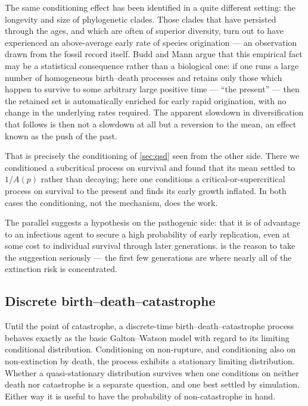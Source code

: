 The same conditioning effect has been identified in a quite different setting: the
longevity and size of phylogenetic clades. Those clades that have persisted through the
ages, and which are often of superior diversity, turn out to have experienced an
above-average early rate of species origination --- an observation drawn from the fossil
record itself. Budd and Mann \cite{Budd2018} argue that this empirical fact may be a
statistical consequence rather than a biological one: if one runs a large number of
homogeneous birth--death processes and retains only those which happen to survive to
some arbitrary large positive time --- ``the present'' --- then the retained set is
automatically enriched for early rapid origination, with no change in the underlying
rates required. The apparent slowdown in diversification that follows is then not a
slowdown at all but a reversion to the mean, an effect known as the push of the past.

That is precisely the conditioning of \cref{sec:qsd} seen from the other side. There we
conditioned a subcritical process on survival and found that its mean settled to
$1/A(p)$ rather than decaying; here one conditions a critical-or-supercritical process
on survival to the present and finds its early growth inflated. In both cases the
conditioning, not the mechanism, does the work.

The parallel suggests a hypothesis on the pathogenic side: that it is of advantage to
an infectious agent to secure a high probability of early replication, even at some
cost to individual survival through later generations.  is the reason
to take the suggestion seriously --- the first few generations are where nearly all of
the extinction risk is concentrated.

\subsection{Discrete birth--death--catastrophe}
\label{sec:bdc}

Until the point of catastrophe, a discrete-time birth--death--catastrophe process
behaves exactly as the basic Galton--Watson model with regard to its limiting
conditional distribution. Conditioning on non-rupture, and conditioning also on
non-extinction by death, the process exhibits a stationary limiting distribution.
Whether a quasi-stationary distribution survives when one conditions on neither death
nor catastrophe is a separate question, and one best settled by simulation. Either way
it is useful to have the probability of non-catastrophe in hand.

